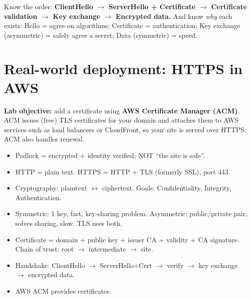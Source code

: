 \begin{examtip}
Know the order: \textbf{ClientHello $\to$ ServerHello + Certificate $\to$ Certificate validation $\to$ Key exchange $\to$ Encrypted data.} And know \emph{why} each exists: Hello = agree on algorithms; Certificate = authentication; Key exchange (asymmetric) = safely agree a secret; Data (symmetric) = speed.
\end{examtip}

\section{Real-world deployment: HTTPS in AWS}
\textbf{Lab objective:} add a certificate using \textbf{AWS Certificate Manager (ACM)}. ACM issues (free) TLS certificates for your domain and attaches them to AWS services such as load balancers or CloudFront, so your site is served over HTTPS. ACM also handles renewal.

\begin{recap}
\begin{itemize}
  \item Padlock = encrypted + identity verified; NOT ``the site is safe''.
  \item HTTP = plain text. HTTPS = HTTP + TLS (formerly SSL), port 443.
  \item Cryptography: plaintext $\leftrightarrow$ ciphertext. Goals: Confidentiality, Integrity, Authentication.
  \item Symmetric: 1 key, fast, key-sharing problem. Asymmetric: public/private pair, solves sharing, slow. TLS uses both.
  \item Certificate = domain + public key + issuer CA + validity + CA signature. Chain of trust: root $\to$ intermediate $\to$ site.
  \item Handshake: ClientHello $\to$ ServerHello+Cert $\to$ verify $\to$ key exchange $\to$ encrypted data.
  \item AWS ACM provides certificates.
\end{itemize}
\end{recap}
